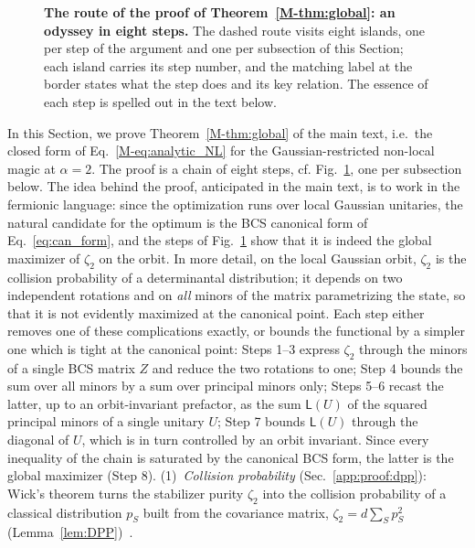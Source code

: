 \documentclass[aps,prl,twocolumn,superscriptaddress,reprint,longbibliography,nofootinbib]{revtex4-2}
\newcommand{\RENYI}{\alpha}
\begin{document}
\begin{figure}[ht!]
\caption{\textbf{The route of the proof of Theorem~\ref{M-thm:global}: an odyssey in eight steps.} The dashed route visits eight islands, one per step of the argument and one per subsection of this Section; each island carries its step number, and the matching label at the border states what the step does and its key relation. The essence of each step is spelled out in the text below.}
\label{fig:odyssey}
\end{figure}

In this Section, we prove Theorem~\ref{M-thm:global} of the main text, i.e.\ the closed form of Eq.~\eqref{M-eq:analytic_NL} for the Gaussian-restricted non-local magic at $\RENYI=2$. The proof is a chain of eight steps, cf. Fig.~\ref{fig:odyssey}, one per subsection below.
The idea behind the proof, anticipated in the main text, is to work in the fermionic language: since the optimization runs over local Gaussian unitaries, the natural candidate for the optimum is the BCS canonical form of Eq.~\eqref{eq:can_form}, and the steps of Fig.~\ref{fig:odyssey} show that it is indeed the global maximizer of $\zeta_2$ on the orbit. In more detail, on the local Gaussian orbit, $\zeta_2$ is the collision probability of a determinantal distribution; it depends on two independent rotations and on \emph{all} minors of the matrix parametrizing the state, so that it is not evidently maximized at the canonical point. Each step either removes one of these complications exactly, or bounds the functional by a simpler one which is tight at the canonical point: Steps 1--3 express $\zeta_2$ through the minors of a single BCS matrix $Z$ and reduce the two rotations to one; Step 4 bounds the sum over all minors by a sum over principal minors only; Steps 5--6 recast the latter, up to an orbit-invariant prefactor, as the sum $\mathsf{L}(U)$ of the squared principal minors of a single unitary $U$; Step 7 bounds $\mathsf{L}(U)$ through the diagonal of $U$, which is in turn controlled by an orbit invariant. Since every inequality of the chain is saturated by the canonical BCS form, the latter is the global maximizer (Step 8).
(1)~\emph{Collision probability} (Sec.~\ref{app:proof:dpp}):  Wick's theorem turns the stabilizer purity $\zeta_2$ into the collision probability of a classical distribution $p_S$  built from the covariance matrix, $\zeta_2=d\sum_Sp_S^2$ (Lemma~\ref{lem:DPP})~\cite{collura2026nonstabilizernessfermionicgaussianstates}.
\end{document}
